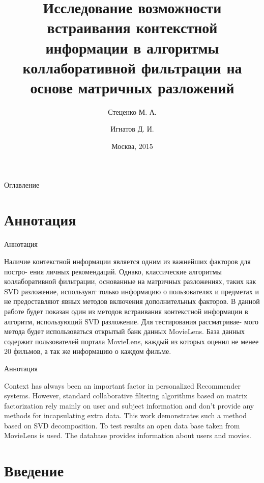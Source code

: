 \documentclass{beamer}
\title{Исследование возможности встраивания контекстной информации в алгоритмы коллаборативной фильтрации на основе матричных разложений}
\author{Стеценко М. А. \and Игнатов Д. И.}
\institute[Национальный исследовательский университет «Высшая школа экономики»] %
{
  Национальный исследовательский университет «Высшая школа экономики» \\
  Факультет компьютерных наук \\ 
  Отделение Прикладной математики и информатики
}
\date{Москва, 2015}
\begin{document}
\begin{frame}
  \titlepage
\end{frame}

\begin{frame}{Оглавление}
  \tableofcontents
\end{frame}

\section{Аннотация}

\begin{frame}{Аннотация}
    \begin{block}{}
    Наличие контекстной информации является одним из важнейших факторов для постро- ения личных рекомендаций. Однако, классические алгоритмы коллаборативной фильтрации, основанные на матричных разложениях, таких как SVD разложение, используют только информацию о пользователях и предметах и не предоставляют явных методов включения дополнительных факторов. В данной работе будет показан один из методов встраивания контекстной информации в алгоритм, использующий SVD разложение. Для тестирования рассматривае- мого метода будет использоваться открытый банк данных MovieLens. База данных содержит пользователей портала MovieLens, каждый из которых оценил не менее 20 фильмов, а так же информацию о каждом фильме.
    \end{block}
\end{frame}

\begin{frame}{Аннотация}
    \begin{block}{}
    Context has always been an important factor in personalized Recommender systems. However, standard collaborative filtering algorithms based on matrix factorization rely mainly on user and subject information and don’t provide any methods for incapsulating extra data. This work demonstrates such a method based on SVD decomposition. To test results an open data base taken from MovieLens is used. The database provides information about users and movies.
    \end{block}
\end{frame}

\section{Введение}
\end{document}
